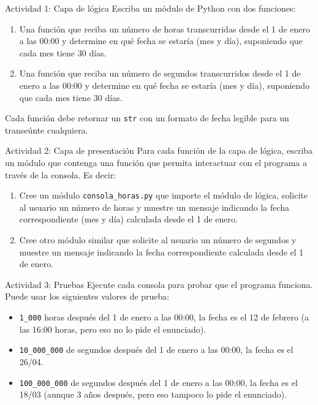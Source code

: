 \documentclass{ip-lab}
\begin{document}
\maketitle

\begin{sectionbox}{Actividad 1: Capa de lógica}
Escriba un módulo de Python con dos funciones:
\begin{enumerate}
    \item Una función que reciba un número de horas transcurridas desde el 1 de enero a las 00:00 y determine en qué fecha se estaría (mes y día), suponiendo que cada mes tiene 30 días.
    \item Una función que reciba un número de segundos transcurridos desde el 1 de enero a las 00:00 y determine en qué fecha se estaría (mes y día), suponiendo que cada mes tiene 30 días.
\end{enumerate}
Cada función debe retornar un \verb|str| con un formato de fecha legible para un transeúnte cualquiera.
\end{sectionbox}

\begin{sectionbox}{Actividad 2: Capa de presentación}
Para cada función de la capa de lógica, escriba un módulo que contenga una función que permita interactuar con el programa a través de la consola. Es decir:
\begin{enumerate}
    \item Cree un módulo \verb|consola_horas.py| que importe el módulo de lógica, solicite al usuario un número de horas y muestre un mensaje indicando la fecha correspondiente (mes y día) calculada desde el 1 de enero.
    \item Cree otro módulo similar que solicite al usuario un número de segundos y muestre un mensaje indicando la fecha correspondiente calculada desde el 1 de enero.
\end{enumerate}
\end{sectionbox}

\begin{sectionbox}{Actividad 3: Pruebas}
Ejecute cada consola para probar que el programa funciona. Puede usar los siguientes valores de prueba:
\begin{itemize}
  \item \verb|1_000| horas después del 1 de enero a las 00:00, la fecha es el 12 de febrero (a las 16:00 horas, pero eso no lo pide el enunciado).
  \item \verb|10_000_000| de segundos después del 1 de enero a las 00:00, la fecha es el 26/04.
  \item \verb|100_000_000| de segundos después del 1 de enero a las 00:00, la fecha es el 18/03 (aunque 3 años después, pero eso tampoco lo pide el enunciado).
\end{itemize}

\end{sectionbox}
\end{document}
